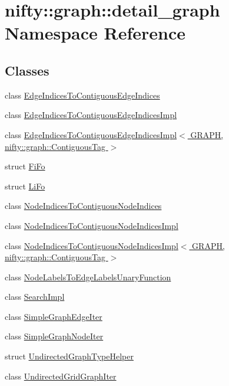\hypertarget{namespacenifty_1_1graph_1_1detail__graph}{}\section{nifty\+:\+:graph\+:\+:detail\+\_\+graph Namespace Reference}
\label{namespacenifty_1_1graph_1_1detail__graph}
\subsection*{Classes}
\begin{DoxyCompactItemize}
\item 
class \hyperlink{classnifty_1_1graph_1_1detail__graph_1_1EdgeIndicesToContiguousEdgeIndices}{Edge\+Indices\+To\+Contiguous\+Edge\+Indices}
\item 
class \hyperlink{classnifty_1_1graph_1_1detail__graph_1_1EdgeIndicesToContiguousEdgeIndicesImpl}{Edge\+Indices\+To\+Contiguous\+Edge\+Indices\+Impl}
\item 
class \hyperlink{classnifty_1_1graph_1_1detail__graph_1_1EdgeIndicesToContiguousEdgeIndicesImpl_3_01GRAPH_00_01ni85a4007f22b365a25e3bd0829bce5cfc}{Edge\+Indices\+To\+Contiguous\+Edge\+Indices\+Impl$<$ G\+R\+A\+P\+H, nifty\+::graph\+::\+Contiguous\+Tag $>$}
\item 
struct \hyperlink{structnifty_1_1graph_1_1detail__graph_1_1FiFo}{Fi\+Fo}
\item 
struct \hyperlink{structnifty_1_1graph_1_1detail__graph_1_1LiFo}{Li\+Fo}
\item 
class \hyperlink{classnifty_1_1graph_1_1detail__graph_1_1NodeIndicesToContiguousNodeIndices}{Node\+Indices\+To\+Contiguous\+Node\+Indices}
\item 
class \hyperlink{classnifty_1_1graph_1_1detail__graph_1_1NodeIndicesToContiguousNodeIndicesImpl}{Node\+Indices\+To\+Contiguous\+Node\+Indices\+Impl}
\item 
class \hyperlink{classnifty_1_1graph_1_1detail__graph_1_1NodeIndicesToContiguousNodeIndicesImpl_3_01GRAPH_00_01ni9b1f0e77953ef9967804436d9931bab9}{Node\+Indices\+To\+Contiguous\+Node\+Indices\+Impl$<$ G\+R\+A\+P\+H, nifty\+::graph\+::\+Contiguous\+Tag $>$}
\item 
class \hyperlink{classnifty_1_1graph_1_1detail__graph_1_1NodeLabelsToEdgeLabelsUnaryFunction}{Node\+Labels\+To\+Edge\+Labels\+Unary\+Function}
\item 
class \hyperlink{classnifty_1_1graph_1_1detail__graph_1_1SearchImpl}{Search\+Impl}
\item 
class \hyperlink{classnifty_1_1graph_1_1detail__graph_1_1SimpleGraphEdgeIter}{Simple\+Graph\+Edge\+Iter}
\item 
class \hyperlink{classnifty_1_1graph_1_1detail__graph_1_1SimpleGraphNodeIter}{Simple\+Graph\+Node\+Iter}
\item 
struct \hyperlink{structnifty_1_1graph_1_1detail__graph_1_1UndirectedGraphTypeHelper}{Undirected\+Graph\+Type\+Helper}
\item 
class \hyperlink{classnifty_1_1graph_1_1detail__graph_1_1UndirectedGridGraphIter}{Undirected\+Grid\+Graph\+Iter}
\end{DoxyCompactItemize}
